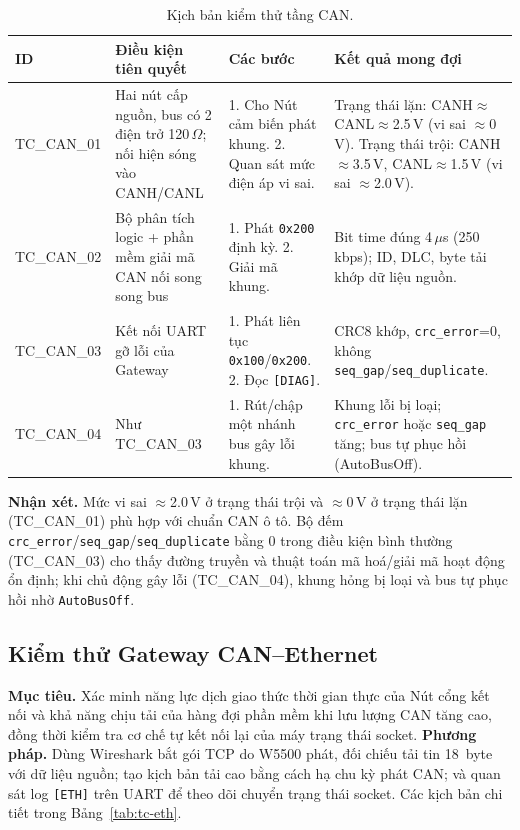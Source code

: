 \documentclass[../DoAn.tex]{subfiles}
\begin{document}
\begin{table}[H]
  \centering
  \caption{Kịch bản kiểm thử tầng CAN.}
  \label{tab:tc-can}
  \begin{tabular}{@{}p{1.7cm}p{2.6cm}p{4.2cm}p{4.2cm}@{}}
    \toprule
    \textbf{ID} & \textbf{Điều kiện tiên quyết} & \textbf{Các bước} & \textbf{Kết quả mong đợi} \\
    \midrule
    TC\_CAN\_01 & Hai nút cấp nguồn, bus có 2 điện trở 120\,$\Omega$; nối hiện
      sóng vào CANH/CANL & 1. Cho Nút cảm biến phát khung. 2. Quan sát mức điện
      áp vi sai. & Trạng thái lặn: CANH$\approx$CANL$\approx$2.5\,V (vi sai
      $\approx$0\,V). Trạng thái trội: CANH$\approx$3.5\,V, CANL$\approx$1.5\,V
      (vi sai $\approx$2.0\,V). \\
    TC\_CAN\_02 & Bộ phân tích logic + phần mềm giải mã CAN nối song song bus &
      1. Phát \texttt{0x200} định kỳ. 2. Giải mã khung. & Bit time đúng 4\,$\mu$s
      (250\,kbps); ID, DLC, byte tải khớp dữ liệu nguồn. %
      \\
    TC\_CAN\_03 & Kết nối UART gỡ lỗi của Gateway & 1. Phát liên tục
      \texttt{0x100}/\texttt{0x200}. 2. Đọc \texttt{[DIAG]}. & CRC8 khớp,
      \texttt{crc\_error}=0, không \texttt{seq\_gap}/\texttt{seq\_duplicate}. \\
    TC\_CAN\_04 & Như TC\_CAN\_03 & 1. Rút/chập một nhánh bus gây lỗi khung. &
      Khung lỗi bị loại; \texttt{crc\_error} hoặc \texttt{seq\_gap} tăng; bus tự
      phục hồi (AutoBusOff). \\
    \bottomrule
  \end{tabular}
\end{table}

\textbf{Nhận xét.} Mức vi sai $\approx$2.0\,V ở trạng thái trội và $\approx$0\,V
ở trạng thái lặn (TC\_CAN\_01) phù hợp với chuẩn CAN ô tô. Bộ đếm
\texttt{crc\_error}/\texttt{seq\_gap}/\texttt{seq\_duplicate} bằng 0 trong điều
kiện bình thường (TC\_CAN\_03) cho thấy đường truyền và thuật toán mã hoá/giải
mã hoạt động ổn định; khi chủ động gây lỗi (TC\_CAN\_04), khung hỏng bị loại và
bus tự phục hồi nhờ \texttt{AutoBusOff}.

\subsection{Kiểm thử Gateway CAN--Ethernet}
\label{section:4.4.2}

\textbf{Mục tiêu.} Xác minh năng lực dịch giao thức thời gian thực của Nút cổng
kết nối và khả năng chịu tải của hàng đợi phần mềm khi lưu lượng CAN tăng cao,
đồng thời kiểm tra cơ chế tự kết nối lại của máy trạng thái socket.
\textbf{Phương pháp.} Dùng Wireshark bắt gói TCP do W5500 phát, đối chiếu tải
tin 18~byte với dữ liệu nguồn; tạo kịch bản tải cao bằng cách hạ chu kỳ phát CAN;
và quan sát log \texttt{[ETH]} trên UART để theo dõi chuyển trạng thái socket.
Các kịch bản chi tiết trong Bảng~\ref{tab:tc-eth}.
\end{document}
